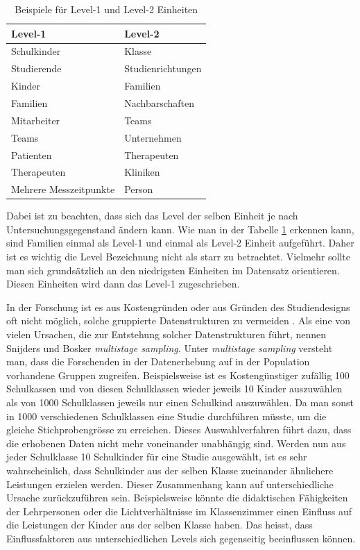 \documentclass[12pt]{article}\usepackage[]{graphicx}\usepackage[]{color}
\numberwithin{equation}{section}
\begin{document}
\begin{table}[h!]
\centering
\caption{Beispiele für Level-1 und Level-2 Einheiten}
\vspace{5mm}
\begin{tabular}{ll}
\toprule
Level-1 				& Level-2 	\\
\midrule
Schulkinder 			& Klasse 	\\
Studierende 			& Studienrichtungen \\
Kinder 					& Familien 	\\
Familien 				& Nachbarschaften \\
Mitarbeiter 			& Teams \\
Teams					& Unternehmen \\
Patienten 				& Therapeuten \\
Therapeuten 			& Kliniken \\
Mehrere Messzeitpunkte 	& Person \\
\bottomrule
\end{tabular}

\label{tab:beispiele_levels}
\end{table}

Dabei ist zu beachten, dass sich das Level der selben Einheit je nach Untersuchungsgegenstand ändern kann. Wie man in der Tabelle \ref{tab:beispiele_levels} erkennen kann, sind Familien einmal als Level-1 und einmal als Level-2 Einheit aufgeführt. Daher ist es wichtig die Level Bezeichnung nicht als starr zu betrachtet. Vielmehr sollte man sich grundsätzlich an den niedrigsten Einheiten im Datensatz orientieren. Diesen Einheiten wird dann das Level-1 zugeschrieben.

In der Forschung ist es aus Kostengründen oder aus Gründen des Studiendesigns oft nicht möglich, solche gruppierte Datenstrukturen zu vermeiden \citep{SnijdersTomA.B2012Ma:a, woltman2012introduction}. Als eine von vielen Ursachen, die zur Entstehung solcher Datenstrukturen führt, nennen Snijders und Bosker \citeyearpar{SnijdersTomA.B2012Ma:a} \textit{multistage sampling}. Unter \textit{multistage sampling} versteht man, dass die Forschenden in der Datenerhebung auf in der Population vorhandene Gruppen zugreifen. Beispielsweise ist es Kostengünstiger zufällig 100 Schulkassen und von diesen Schulklassen wieder jeweils 10 Kinder auszuwählen als von 1000 Schulklassen jeweils nur einen Schulkind auszuwählen. Da man sonst in 1000 verschiedenen Schulklassen eine Studie durchführen müsste, um die gleiche Stichprobengrösse zu erreichen. Dieses Auswahlverfahren führt dazu, dass die erhobenen Daten nicht mehr voneinander unabhängig sind. Werden nun aus jeder Schulklasse 10 Schulkinder für eine Studie ausgewählt, ist es sehr wahrscheinlich, dass Schulkinder aus der selben Klasse zueinander ähnlichere Leistungen erzielen werden. Dieser Zusammenhang kann auf unterschiedliche Ursache zurückzuführen sein. Beispielsweise könnte die didaktischen Fähigkeiten der Lehrpersonen oder die Lichtverhältnisse im Klassenzimmer einen Einfluss auf die Leistungen der Kinder aus der selben Klasse haben. Das heisst, dass Einflussfaktoren aus unterschiedlichen Levels sich gegenseitig beeinflussen können. 
\end{document}

